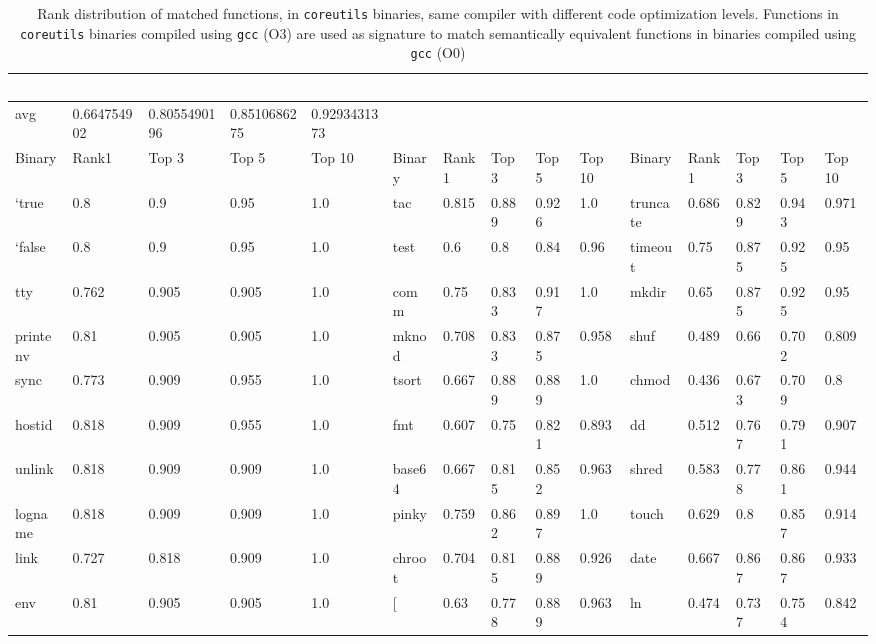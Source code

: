\begin{table*}[h!]
	\begin{center}
		\caption{Rank distribution of matched functions, in \texttt{coreutils} binaries, same compiler with different code optimization levels. Functions in \texttt{coreutils} binaries compiled using \texttt{gcc} (O3) are used as signature to match semantically  equivalent functions in binaries compiled using \texttt{gcc} (O0)\\}
		\label{tab:x86_gcc_O3_clang_O0}
		\scriptsize
\begin{tabular}{ | l | l | l | l | l | l | l | l | l | l | l | l | l | l | l | }
\hline
	\  & \  & \  & \  & \  & \  & \  & \  & \  & \  & \  & \  & \  & \  & \  \\ \hline
	avg & 0.664754902 & 0.8055490196 & 0.8510686275 & 0.9293431373 & \  & \  & \  & \  & \  & \  & \  & \  & \  & \  \\ \hline
	Binary & Rank1 & Top 3 & Top 5 & Top 10 & Binary & Rank1 & Top 3 & Top 5 & Top 10 & Binary & Rank1 & Top 3 & Top 5 & Top 10 \\ \hline
	`true & 0.8 & 0.9 & 0.95 & 1.0 & tac & 0.815 & 0.889 & 0.926 & 1.0 & truncate & 0.686 & 0.829 & 0.943 & 0.971 \\ \hline
	`false & 0.8 & 0.9 & 0.95 & 1.0 & test & 0.6 & 0.8 & 0.84 & 0.96 & timeout & 0.75 & 0.875 & 0.925 & 0.95 \\ \hline
	tty & 0.762 & 0.905 & 0.905 & 1.0 & comm & 0.75 & 0.833 & 0.917 & 1.0 & mkdir & 0.65 & 0.875 & 0.925 & 0.95 \\ \hline
	printenv & 0.81 & 0.905 & 0.905 & 1.0 & mknod & 0.708 & 0.833 & 0.875 & 0.958 & shuf & 0.489 & 0.66 & 0.702 & 0.809 \\ \hline
	sync & 0.773 & 0.909 & 0.955 & 1.0 & tsort & 0.667 & 0.889 & 0.889 & 1.0 & chmod & 0.436 & 0.673 & 0.709 & 0.8 \\ \hline
	hostid & 0.818 & 0.909 & 0.955 & 1.0 & fmt & 0.607 & 0.75 & 0.821 & 0.893 & dd & 0.512 & 0.767 & 0.791 & 0.907 \\ \hline
	unlink & 0.818 & 0.909 & 0.909 & 1.0 & base64 & 0.667 & 0.815 & 0.852 & 0.963 & shred & 0.583 & 0.778 & 0.861 & 0.944 \\ \hline
	logname & 0.818 & 0.909 & 0.909 & 1.0 & pinky & 0.759 & 0.862 & 0.897 & 1.0 & touch & 0.629 & 0.8 & 0.857 & 0.914 \\ \hline
	link & 0.727 & 0.818 & 0.909 & 1.0 & chroot & 0.704 & 0.815 & 0.889 & 0.926 & date & 0.667 & 0.867 & 0.867 & 0.933 \\ \hline
	env & 0.81 & 0.905 & 0.905 & 1.0 & [ & 0.63 & 0.778 & 0.889 & 0.963 & ln & 0.474 & 0.737 & 0.754 & 0.842 \\ \hline

\end{tabular}
\end{center}
\end{table*}
